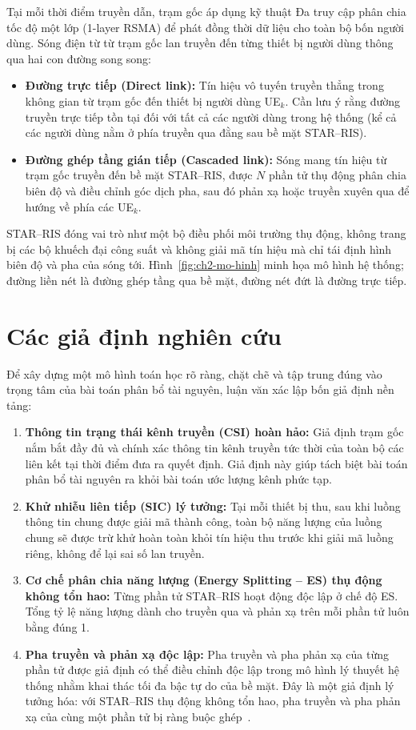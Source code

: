 Tại mỗi thời điểm truyền dẫn, trạm gốc áp dụng kỹ thuật Đa truy cập phân chia tốc độ một lớp (1-layer
RSMA) để phát đồng thời dữ liệu cho toàn bộ bốn người dùng. Sóng điện từ từ trạm gốc lan truyền đến từng
thiết bị người dùng thông qua hai con đường song song:
\begin{itemize}
\item \textbf{Đường trực tiếp (Direct link):} Tín hiệu vô tuyến truyền thẳng trong không gian từ trạm gốc
  đến thiết bị người dùng UE$_k$. Cần lưu ý rằng đường truyền trực tiếp tồn tại đối với tất cả các người dùng
  trong hệ thống (kể cả các người dùng nằm ở phía truyền qua đằng sau bề mặt STAR--RIS).
\item \textbf{Đường ghép tầng gián tiếp (Cascaded link):} Sóng mang tín hiệu từ trạm gốc truyền đến bề mặt
  STAR--RIS, được $N$ phần tử thụ động phân chia biên độ và điều chỉnh góc dịch pha, sau đó phản xạ hoặc
  truyền xuyên qua để hướng về phía các UE$_k$.
\end{itemize}
STAR--RIS đóng vai trò như một bộ điều phối môi trường thụ động, không trang bị các bộ khuếch đại công suất
và không giải mã tín hiệu mà chỉ tái định hình biên độ và pha của sóng tới. Hình~\ref{fig:ch2-mo-hinh} minh
họa mô hình hệ thống; đường liền nét là đường ghép tầng qua bề mặt, đường nét đứt là đường trực tiếp.



\section{Các giả định nghiên cứu}
\label{sec:gia-dinh}

Để xây dựng một mô hình toán học rõ ràng, chặt chẽ và tập trung đúng vào trọng tâm của bài toán phân bổ tài
nguyên, luận văn xác lập bốn giả định nền tảng:
\begin{enumerate}
\item \textbf{Thông tin trạng thái kênh truyền (CSI) hoàn hảo:} Giả định trạm gốc nắm bắt đầy đủ và chính
  xác thông tin kênh truyền tức thời của toàn bộ các liên kết tại thời điểm đưa ra quyết định. Giả định này
  giúp tách biệt bài toán phân bổ tài nguyên ra khỏi bài toán ước lượng kênh phức tạp.
\item \textbf{Khử nhiễu liên tiếp (SIC) lý tưởng:} Tại mỗi thiết bị thu, sau khi luồng thông tin chung được
  giải mã thành công, toàn bộ năng lượng của luồng chung sẽ được trừ khử hoàn toàn khỏi tín hiệu thu trước
  khi giải mã luồng riêng, không để lại sai số lan truyền.
\item \textbf{Cơ chế phân chia năng lượng (Energy Splitting -- ES) thụ động không tổn hao:} Từng phần tử
  STAR--RIS hoạt động độc lập ở chế độ ES. Tổng tỷ lệ năng lượng dành cho truyền qua và phản xạ trên mỗi
  phần tử luôn bằng đúng 1.
\item \textbf{Pha truyền và phản xạ độc lập:} Pha truyền và pha phản xạ của từng phần tử được giả định có
  thể điều chỉnh độc lập trong mô hình lý thuyết hệ thống nhằm khai thác tối đa bậc tự do của bề mặt. Đây là
  một giả định lý tưởng hóa: với STAR--RIS thụ động không tổn hao, pha truyền và pha phản xạ của cùng một
  phần tử bị ràng buộc ghép~\cite{Liu2021STARCoupledPhase, Wang2022STAROptimization}.
\end{enumerate}

